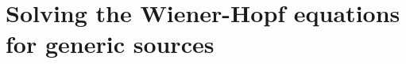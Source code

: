 \documentclass[preprint,aps,eqsecnum, prb]{revtex4-1}
\newcommand{\fplus}[1]{{#1}^{+}}
\newcommand{\fminus}[1]{{#1}^{-}}
\newcommand{\fplusminus}[1]{{#1}^{\pm}}
\begin{document}

\section{Solving the Wiener-Hopf equations for generic sources}
\label{sec:wh-solution}
\end{document}
